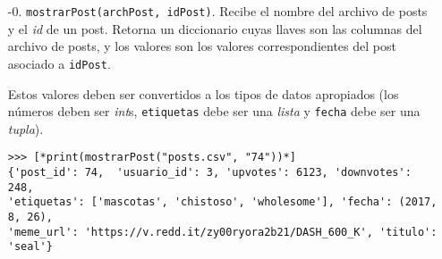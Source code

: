 \begin{enumerate}
    \item[-0.] \texttt{mostrarPost(archPost, idPost)}. Recibe el nombre del archivo de posts y el \textit{id} de un post. Retorna un diccionario cuyas llaves son las columnas del archivo de posts, y los valores son los valores correspondientes del post asociado a \texttt{idPost}. 
    
    Estos valores deben ser convertidos a los tipos de datos apropiados (los números deben ser \textit{int}s, \texttt{etiquetas} debe ser una \textit{lista} y \texttt{fecha} debe ser una \textit{tupla}).

    \begin{lstlisting}[style=consola]
>>> [*print(mostrarPost("posts.csv", "74"))*]
{'post_id': 74,  'usuario_id': 3, 'upvotes': 6123, 'downvotes': 248,
'etiquetas': ['mascotas', 'chistoso', 'wholesome'], 'fecha': (2017, 8, 26),
'meme_url': 'https://v.redd.it/zy00ryora2b21/DASH_600_K', 'titulo': 'seal'}
    \end{lstlisting}

\end{enumerate}
